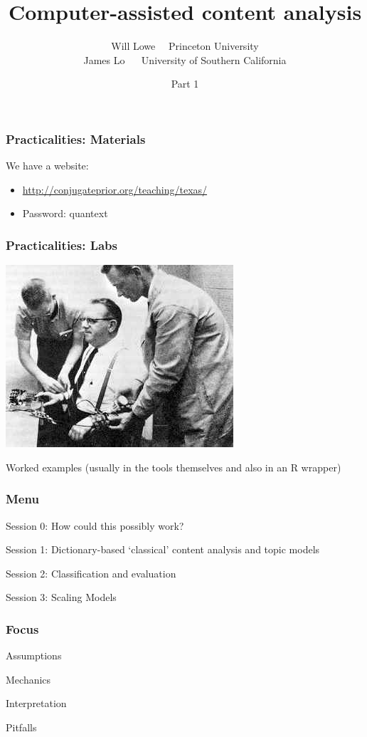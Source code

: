 \documentclass[11pt,compress,professionalfonts]{beamer}
\title{Computer-assisted content analysis}
\author{Will Lowe ~~Princeton University\\James Lo ~~ University of Southern California}
\date{Part 1}
\newcommand{\ita}{\begin{itemize}}
\newcommand{\itm}{\item[]}
\newcommand{\itz}{\end{itemize}}
\begin{document}
\maketitle


\begin{frame}[t]\frametitle{Practicalities: Materials}

We have a website:
\ita
\itm \url{http://conjugateprior.org/teaching/texas/}
\itm Password: quantext
\itz

\end{frame}
\begin{frame}[t]\frametitle{Practicalities: Labs}

\centerline{\includegraphics[scale=0.25]{pictures/milgram-subject}}

Worked examples (usually in the tools themselves and also in an R wrapper)

\end{frame}
\begin{frame}[t]\frametitle{Menu}

Session 0: How could this possibly work?

Session 1: Dictionary-based `classical' content analysis and topic models

Session 2: Classification and evaluation

Session 3: Scaling Models


\end{frame}
\begin{frame}[t]\frametitle{Focus}

Assumptions

Mechanics

Interpretation

Pitfalls


%

\newpage

\end{frame}
\end{document}

